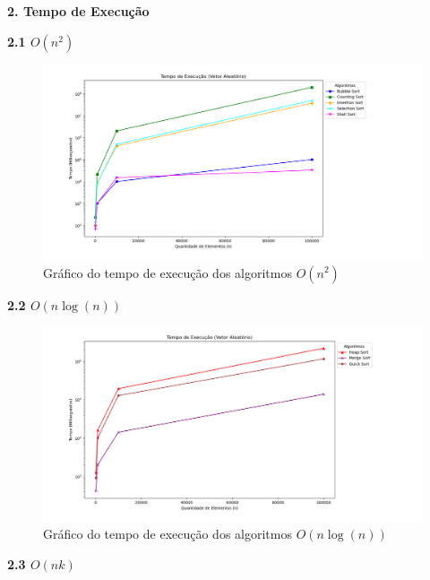 \documentclass[10pt]{article}
\begin{document}
\vspace{0.25cm}

\textbf{2. Tempo de Execução}

\vspace{0.5cm}

\textbf{2.1 $O(n^2)$}

\begin{figure}[H]
  \centering
  \includegraphics[width=1.1\textwidth]{TempoExecn2.png}
  \caption{Gráfico do tempo de execução dos algoritmos $O(n^2)$}
  \label{fig:1}
\end{figure}

\vspace{0.5cm}

\textbf{2.2 $O(n \log(n))$}

\begin{figure}[H]
  \centering
  \includegraphics[width=1.1\textwidth]{TempoExecnlogn.png}
  \caption{Gráfico do tempo de execução dos algoritmos $O(n \log(n))$}
  \label{fig:2}
\end{figure}

\vspace{0.5cm}

\textbf{2.3 $O(n k)$}
\end{document}

